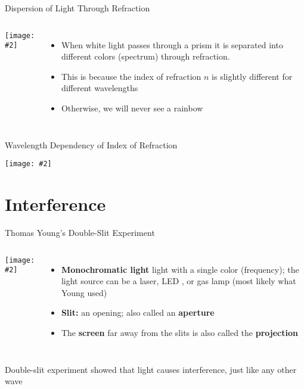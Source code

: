 \documentclass[compress,aspectratio=169]{beamer}
\newcommand{\pic}[2]{\texttt{[image: \#2]}}
\begin{document}
\begin{frame}{Dispersion of Light Through Refraction}
  \begin{columns}
    \pic{1}{graphics/white-light-split-into-colours-by-a-prism-pasieka.jpg}

    \begin{itemize}
    \item When white light passes through a prism it is separated into
      different colors (spectrum) through refraction.
    \item This is because the index of refraction $n$ is slightly different for
      different wavelengths
    \item Otherwise, we will never see a rainbow
    \end{itemize}
  \end{columns}
\end{frame}



\begin{frame}{Wavelength Dependency of Index of Refraction}
  \begin{center}
    \pic{.5}{graphics/Dispersion-curve.png}
  \end{center}
\end{frame}



\section{Interference}

\begin{frame}{Thomas Young's Double-Slit Experiment}
  \begin{columns}
    \pic{1}{graphics/double-slit1.png}
    
    \begin{itemize}
    \item\textbf{Monochromatic light} light with a single color (frequency);
      the light source can be a laser, LED , or gas lamp (most likely what Young
      used)
    \item\textbf{Slit:} an opening; also called an \textbf{aperture}
    \item The \textbf{screen} far away from the slits is also called the
      \textbf{projection}
    \end{itemize}
  \end{columns}

  \vspace{.15in}Double-slit experiment showed that light causes interference,
  just like any other wave
\end{frame}
\end{document}
